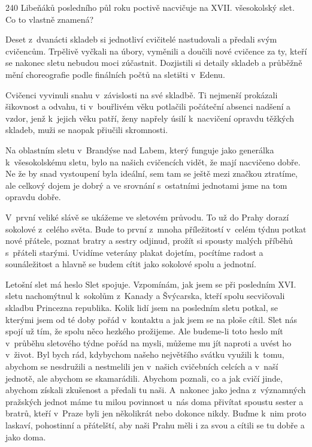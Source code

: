 \documentclass[11pt]{article}
\begin{document}
240 Libeňáků posledního půl roku poctivě nacvičuje na XVII. všesokolský slet.
Co to vlastně znamená?

Deset z~dvanácti skladeb si jednotliví cvičitelé nastudovali a předali svým cvičencům. Trpělivě vyčkali na úbory, vyměnili a doučili nové cvičence za ty, kteří se nakonec sletu nebudou moci zúčastnit. Dozjistili si detaily skladeb a průběžně mění choreografie podle finálních počtů na sletišti v~Edenu.

Cvičenci vyvinuli snahu v~závislosti na své skladbě. Ti nejmenší prokázali šikovnost a odvahu, ti v~bouřlivém věku potlačili počáteční absenci nadšení a vzdor, jenž k~jejich věku patří, ženy napřely úsilí k~nacvičení opravdu těžkých skladeb, muži se naopak přiučili skromnosti.

Na oblastním sletu v~Brandýse nad Labem, který funguje jako generálka k~všesokolskému sletu, bylo na našich cvičencích vidět, že mají nacvičeno dobře. Ne že by snad vystoupení byla ideální, sem tam se ještě mezi značkou ztratíme, ale celkový dojem je dobrý a ve srovnání s~ostatními jednotami jsme na tom opravdu dobře.

V~první veliké slávě se ukážeme ve sletovém průvodu. To už do Prahy dorazí sokolové z~celého světa. Bude to první z~mnoha příležitostí v~celém týdnu potkat nové přátele, poznat bratry a sestry odjinud, prožít si spousty malých příběhů s~přáteli starými. Uvidíme veterány plakat dojetím, pocítíme radost a sounáležitost a hlavně se budem cítit jako sokolové spolu a jednotní.

Letošní slet má heslo Slet spojuje. Vzpomínám, jak jsem se při posledním XVI. sletu nachomýtnul k~sokolům z~Kanady a Švýcarska, kteří spolu secvičovali skladbu Princezna republika. Kolik lidí jsem na posledním sletu potkal, se kterými jsem od té doby pořád v~kontaktu a jak jsem se na ploše cítil. Slet nás spojí už tím, že spolu něco hezkého prožijeme. Ale budeme-li toto heslo mít v~průběhu sletového týdne pořád na mysli, můžeme mu jít naproti a uvést ho v~život. Byl bych rád, kdybychom našeho největšího svátku využili k~tomu, abychom se nesdružili a nestmelili jen v~našich cvičebních celcích a v~naší jednotě, ale abychom se skamarádili. Abychom poznali, co a jak cvičí jinde, abychom získali zkušenost a předali tu naši. A~nakonec jako jedna z~významných pražských jednot máme tu milou povinnost u~nás doma přivítat spoustu sester a bratrů, kteří v~Praze byli jen několikrát nebo dokonce nikdy. Buďme k~nim proto laskaví, pohostinní a přátelští, aby naši Prahu měli i za svou a cítili se tu dobře a jako doma.
\end{document}
